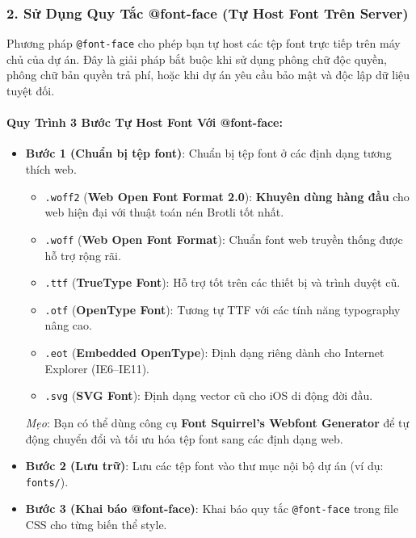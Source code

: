 \documentclass[11pt,oneside]{book}
\newcommand{\codeinline}[1]{\textcolor{accentOrange}{\texttt{#1}}}
\newcommand{\term}[1]{\textbf{\textcolor{primaryBlue}{#1}}}
\begin{document}
\subsubsection{2. Sử Dụng Quy Tắc @font-face (Tự Host Font Trên Server)}

Phương pháp \codeinline{@font-face} cho phép bạn tự host các tệp font trực tiếp trên máy chủ của dự án. Đây là giải pháp bắt buộc khi sử dụng phông chữ độc quyền, phông chữ bản quyền trả phí, hoặc khi dự án yêu cầu bảo mật và độc lập dữ liệu tuyệt đối.

\paragraph{Quy Trình 3 Bước Tự Host Font Với @font-face:}

\begin{itemize}[leftmargin=1.5em, itemsep=4pt, parsep=0pt]
    \item \textbf{Bước 1 (Chuẩn bị tệp font)}: Chuẩn bị tệp font ở các định dạng tương thích web.
    \begin{itemize}[leftmargin=1.2em, itemsep=3pt, parsep=0pt]
        \item \codeinline{.woff2} (\term{Web Open Font Format 2.0}): \textbf{Khuyên dùng hàng đầu} cho web hiện đại với thuật toán nén Brotli tốt nhất.
        \item \codeinline{.woff} (\term{Web Open Font Format}): Chuẩn font web truyền thống được hỗ trợ rộng rãi.
        \item \codeinline{.ttf} (\term{TrueType Font}): Hỗ trợ tốt trên các thiết bị và trình duyệt cũ.
        \item \codeinline{.otf} (\term{OpenType Font}): Tương tự TTF với các tính năng typography nâng cao.
        \item \codeinline{.eot} (\term{Embedded OpenType}): Định dạng riêng dành cho Internet Explorer (IE6--IE11).
        \item \codeinline{.svg} (\term{SVG Font}): Định dạng vector cũ cho iOS di động đời đầu.
    \end{itemize}
    \textit{Mẹo}: Bạn có thể dùng công cụ \term{Font Squirrel's Webfont Generator} để tự động chuyển đổi và tối ưu hóa tệp font sang các định dạng web.

    \item \textbf{Bước 2 (Lưu trữ)}: Lưu các tệp font vào thư mục nội bộ dự án (ví dụ: \codeinline{fonts/}).
    \item \textbf{Bước 3 (Khai báo @font-face)}: Khai báo quy tắc \codeinline{@font-face} trong file CSS cho từng biến thể style.
\end{itemize}
\end{document}
